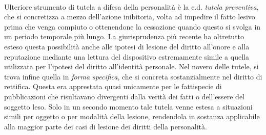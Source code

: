 \\Ulteriore strumento di tutela a difesa della personalità è la c.d. \textit{tutela preventiva}, che si concretizza a mezzo dell'azione inibitoria, volta ad impedire il fatto lesivo prima che venga compiuto o ottenendone la cessazione quando questo si svolga in un periodo temporale più lungo.
La giurisprudenza più recente ha oltretutto esteso questa possibilità anche alle ipotesi di lesione del diritto all'onore e alla reputazione mediante una lettura del dispositivo estremamente simile a quella utilizzata per l'ipotesi del diritto all'identità personale.
Nel novero delle tutele, si trova infine quella in \textit{forma specifica}, che si concreta sostanzialmente nel diritto di rettifica.
Questa era apprestata quasi unicamente per le fattispecie di pubblicazioni che risultavano divergenti dalla verità dei fatti o dell'essere del soggetto leso. Solo in un secondo momento tale tutela venne estesa a situazioni simili per oggetto o per modalità della lesione, rendendola in sostanza applicabile alla maggior parte dei casi di lesione dei diritti della personalità.
